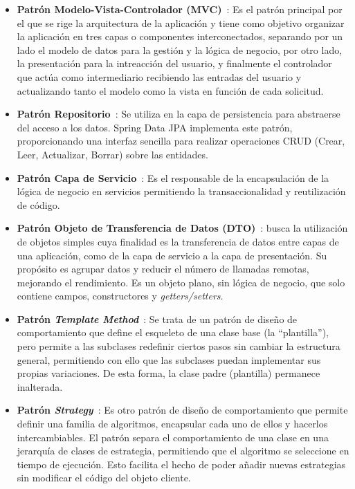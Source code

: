\begin{itemize}
    \item \textbf{Patrón Modelo-Vista-Controlador (MVC)}~\cite{patron-mvc}: Es el patrón principal por el que se rige la arquitectura de la aplicación y tiene como objetivo organizar la aplicación en tres capas o componentes interconectados, separando por un lado el modelo de datos para la gestión y la lógica de negocio, por otro lado, la presentación para la intreacción del usuario, y finalmente el controlador que actúa como intermediario recibiendo las entradas del usuario y actualizando tanto el modelo como la vista en función de cada solicitud.
    \item \textbf{Patrón Repositorio}~\cite{patron-repository}: Se utiliza en la capa de persistencia para abstraerse del acceso a los datos. Spring Data JPA implementa este patrón, proporcionando una interfaz sencilla para realizar operaciones CRUD (Crear, Leer, Actualizar, Borrar) sobre las entidades.
    \item \textbf{Patrón Capa de Servicio}~\cite{patron-service}: Es el responsable de la encapsulación de la lógica de negocio en servicios permitiendo la transaccionalidad y reutilización de código.
    \item \textbf{Patrón Objeto de Transferencia de Datos (DTO)}~\cite{patron-dto}: busca la utilización de objetos simples cuya finalidad es la transferencia de datos entre capas de una aplicación, como de la capa de servicio a la capa de presentación. Su propósito es agrupar datos y reducir el número de llamadas remotas, mejorando el rendimiento. Es un objeto plano, sin lógica de negocio, que solo contiene campos, constructores y \emph{getters/setters}.
    \item \textbf{Patrón \emph{Template Method}}~\cite{patron-template}: Se trata de un patrón de diseño de comportamiento que define el esqueleto de una clase base (la ``plantilla''), pero permite a las subclases redefinir ciertos pasos sin cambiar la estructura general, permitiendo con ello que las subclases puedan implementar sus propias variaciones. De esta forma, la clase padre (plantilla) permanece inalterada.
    \item \textbf{Patrón \emph{Strategy}}~\cite{patron-strategy}: Es otro patrón de diseño de comportamiento que permite definir una familia de algoritmos, encapsular cada uno de ellos y hacerlos intercambiables. El patrón separa el comportamiento de una clase en una jerarquía de clases de estrategia, permitiendo que el algoritmo se seleccione en tiempo de ejecución. Esto facilita el hecho de poder añadir nuevas estrategias sin modificar el código del objeto cliente.
\end{itemize}

